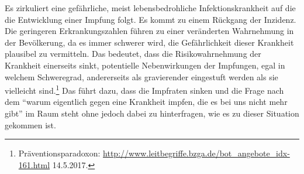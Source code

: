 \documentclass[
    a4paper,
    12pt,
    hyphens,
    chapterprefix=true,
    headheight=33pt,
    footheight=29pt,
    headings=optiontohead, %
]{scrartcl}
\begin{document}
{Es zirkuliert eine gefährliche, meist lebensbedrohliche Infektionskrankheit auf die die Entwicklung einer Impfung folgt. Es kommt zu einem Rückgang der Inzidenz. Die geringeren Erkrankungszahlen führen zu einer veränderten Wahrnehmung in der Bevölkerung, da es immer schwerer wird, die Gefährlichkeit dieser Krankheit plausibel zu vermitteln. Das bedeutet, dass die Risikowahrnehmung der Krankheit einerseits sinkt, potentielle Nebenwirkungen der Impfungen, egal in welchem Schweregrad, andererseits als gravierender eingestuft werden als sie vielleicht sind.\footnote{Präventionsparadoxon: \url{http://www.leitbegriffe.bzga.de/bot_angebote_idx-161.html} 14.5.2017.} Das führt dazu, dass die Impfraten sinken und die Frage nach dem "`warum eigentlich gegen eine Krankheit impfen, die es bei uns nicht mehr gibt"' im Raum steht ohne jedoch dabei zu hinterfragen, wie es zu dieser Situation gekommen ist.\\

}
\end{document}

